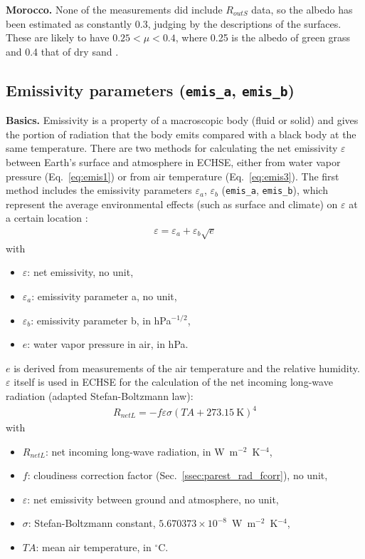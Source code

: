 \documentclass{scrreprt}
\newenvironment{denseitem}{
  \begin{itemize}
    \setlength{\itemsep}{0pt}
    \setlength{\parskip}{0pt}
    \setlength{\parsep}{0pt}
}{
  \end{itemize}
}
\begin{document}
\noindent
\textbf{Morocco.}
None of the measurements did include $R_{outS}$ data, so the albedo has been estimated as constantly 0.3, judging by the descriptions of the surfaces.
These are likely to have $0.25 < \mu < 0.4$, where 0.25 is the albedo of green grass \citep{markvart03} and 0.4 that of dry sand \citep{tetzlaff83}.

\newpage
\subsection{Emissivity parameters (\texttt{emis\_a}, \texttt{emis\_b})} \label{ssec:parest_rad_emis}

\textbf{Basics.}
Emissivity is a property of a macroscopic body (fluid or solid) and gives the portion of radiation that the body emits compared with a black body at the same temperature.
There are two methods for calculating the net emissivity $\varepsilon$ between Earth's surface and atmosphere in ECHSE, either from water vapor pressure (Eq.~\ref{eq:emis1}) or from air temperature (Eq.~\ref{eq:emis3}).
The first method includes the emissivity parameters $\varepsilon_a$, $\varepsilon_b$ (\verb!emis_a!, \verb!emis_b!), which represent the average environmental effects (such as surface and climate) on $\varepsilon$ at a certain location \citep{brunt32}:
\begin{align} \label{eq:emis1}
  \varepsilon = \varepsilon_a + \varepsilon_b \sqrt{e}
\end{align}
%
with
\begin{denseitem}
  \item[] $\varepsilon$: net emissivity, no unit,
  \item[] $\varepsilon_a$: emissivity parameter a, no unit,
  \item[] $\varepsilon_b$: emissivity parameter b, in hPa$^{-1/2}$,
  \item[] $e$: water vapor pressure in air, in hPa.
\end{denseitem}
%
$e$ is derived from measurements of the air temperature and the relative humidity.
$\varepsilon$ itself is used in ECHSE for the calculation of the net incoming long-wave radiation (adapted Stefan-Boltzmann law):
\begin{align} \label{eq:emis2}
  R_{netL} = -f \varepsilon \sigma (TA + 273.15~\text{K})^4
\end{align}
%
with
\begin{denseitem}
  \item[] $R_{netL}$: net incoming long-wave radiation, in W~m$^{-2}$~K$^{-4}$,
  \item[] $f$: cloudiness correction factor (Sec.~\ref{ssec:parest_rad_fcorr}), no unit,
  \item[] $\varepsilon$: net emissivity between ground and atmosphere, no unit,
  \item[] $\sigma$: Stefan-Boltzmann constant, $5.670373 \times 10^{-8}$~W~m$^{-2}$~K$^{-4}$,
  \item[] ${TA}$: mean air temperature, in $^\circ$C.
\end{denseitem}
\end{document}
